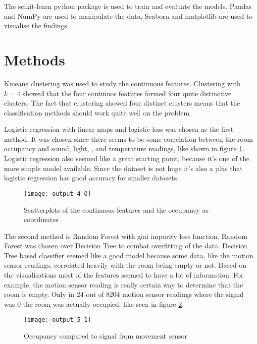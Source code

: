 \documentclass[11pt]{article}
\begin{document}
The scikit-learn\cite{scikit-learn} python package is used to train and evaluate the models. 
Pandas\cite{pandas} and NumPy\cite{numpy} are used to manipulate the data.
Seaborn\cite{seaborn} and matplotlib\cite{matplotlib} are used to visualise the findings.

\section{Methods}

Kmeans clustering was used to study the continuous features.
Clustering with $k=4$ showed that the four continuos features formed four quite distinctive clusters.
The fact that clustering showed four distinct clusters means that the classification methods should work quite well on the problem.

Logistic regression with linear maps and logistic loss was chosen as the first method.
It was chosen since there seems to be some correlation between the room occupancy and sound, light, , and temperature readings, like shown in figure \ref{figure:1}.
Logistic regression also seemed like a great starting point, because it's one of the more simple model available. 
Since the dataset is not huge it's also a plus that logistic regression has good accuracy for smaller datasets.

\begin{figure}[h!]
    \centering
    \texttt{[image: output\_4\_0]}
    \caption{Scatterplots of the continuous features and the occupancy as coordinates}
    \label{figure:1}
\end{figure}

The second method is Random Forest with gini impurity loss function.
Random Forest was chosen over Decision Tree to combat overfitting of the data.
Decision Tree based classifier seemed like a good model because some data, like the motion sensor readings, correlated heavily with the room being empty or not.
Based on the visualisations most of the features seemed to have a lot of information.
For example, the motion sensor reading is really certain way to determine that the room is empty.
Only in 24 out of 8204 motion sensor readings where the signal was 0 the room was actually occupied, like seen in figure \ref{figure:2}. 

\begin{figure}[h!]
    \centering
    \texttt{[image: output\_5\_1]}
    \caption{Occupancy compared to signal from movement sensor}
    \label{figure:2}
\end{figure}
\end{document}

